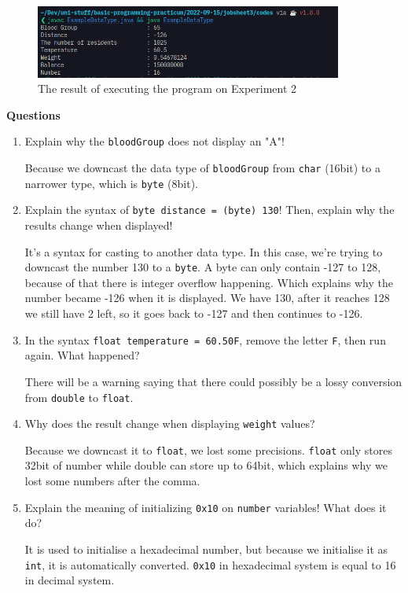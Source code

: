 \documentclass[12pt,titlepage]{article}
\begin{document}
\begin{enumerate}
{        \begin{figure}[h]
            \centering
            \includegraphics[width=0.9\textwidth]{./images/datatype-output.png}
            \caption{The result of executing the program on Experiment 2}
        \end{figure}
    }
\end{enumerate}
\textbf{Questions}
\begin{enumerate}
    \item { 
        Explain why the \texttt{bloodGroup} does not display an "A"!

        Because we downcast the data type of \texttt{bloodGroup} from \texttt{char} (16bit) to a narrower type, which is \texttt{byte} (8bit).
    }
    \item {
        Explain the syntax of \texttt{byte distance = (byte) 130}! Then, explain why the results change when displayed!

        It's a syntax for casting to another data type. In this case, we're trying to downcast the number 130 to a \texttt{byte}.
        A byte can only contain -127 to 128, because of that there is integer overflow happening. Which explains why the number became -126 when it is displayed.
        We have 130, after it reaches 128 we still have 2 left, so it goes back to -127 and then continues to -126.
    }
    \item {
        In the syntax \texttt{float temperature = 60.50F}, remove the letter \texttt{F}, then run again. What happened?

        There will be a warning saying that there could possibly be a lossy conversion from \texttt{double} to \texttt{float}.
    }
    \item {
        Why does the result change when displaying \texttt{weight} values?

        Because we downcast it to \texttt{float}, we lost some precisions. \texttt{float} only stores 32bit of number while double can store up to 64bit, which explains why we lost some numbers after the comma.
    }
    \item {
        Explain the meaning of initializing \texttt{0x10} on \texttt{number} variables! What does it do?

        It is used to initialise a hexadecimal number, but because we initialise it as \texttt{int}, it is automatically converted.
        \texttt{0x10} in hexadecimal system is equal to 16 in decimal system.
    }
\end{enumerate}
\end{document}
